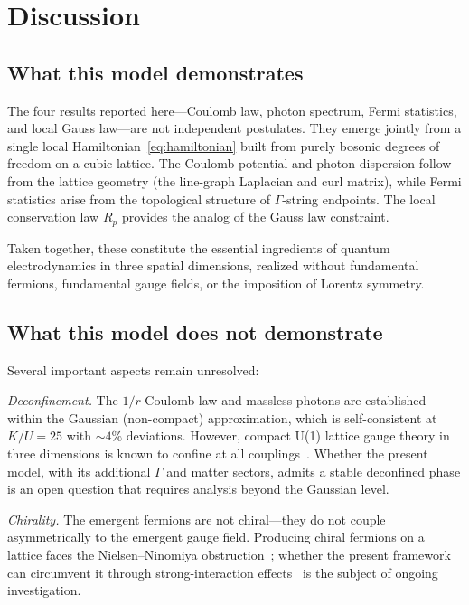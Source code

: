 \documentclass[aps,prb,twocolumn,superscriptaddress,showpacs]{revtex4-2}
\begin{document}
\section{Discussion}
\label{sec:discussion}

\subsection{What this model demonstrates}

The four results reported here---Coulomb law, photon spectrum, Fermi
statistics, and local Gauss law---are not independent postulates. They
emerge jointly from a single local Hamiltonian~\eqref{eq:hamiltonian}
built from purely bosonic degrees of freedom on a cubic lattice. The
Coulomb potential and photon dispersion follow from the lattice geometry
(the line-graph Laplacian and curl matrix), while Fermi statistics arise
from the topological structure of $\Gamma$-string endpoints. The local
conservation law $R_p$ provides the analog of the Gauss law constraint.

Taken together, these constitute the essential ingredients of quantum
electrodynamics in three spatial dimensions, realized without fundamental
fermions, fundamental gauge fields, or the imposition of Lorentz symmetry.

\subsection{What this model does not demonstrate}

Several important aspects remain unresolved:

\textit{Deconfinement.} The $1/r$ Coulomb law and massless photons are
established within the Gaussian (non-compact) approximation, which is
self-consistent at $K/U=25$ with $\sim 4\%$ deviations. However, compact
U(1) lattice gauge theory in three dimensions is known to confine at all
couplings~\cite{polyakov1977}. Whether the present model, with its
additional $\Gamma$ and matter sectors, admits a stable deconfined phase
is an open question that requires analysis beyond the Gaussian level.

\textit{Chirality.} The emergent fermions are not chiral---they do not
couple asymmetrically to the emergent gauge field. Producing chiral
fermions on a lattice faces the Nielsen--Ninomiya obstruction~\cite{nielsen1981a,nielsen1981b}; whether the present framework can circumvent it
through strong-interaction effects~\cite{wang2020,wen2013,you2018} is
the subject of ongoing investigation.
\end{document}
